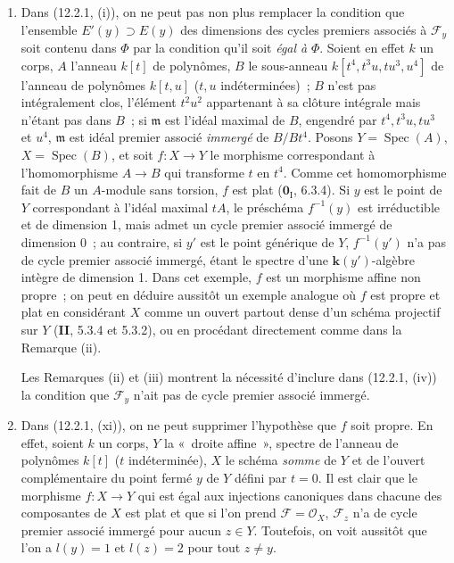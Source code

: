 \begin{remarks}[12.2.3]
\begin{enumerate}[label=(\roman*)]
  \item Dans (12.2.1, (i)), on ne peut pas non plus remplacer la condition que
  l'ensemble $E'(y)\supset E(y)$ des dimensions des cycles premiers associés à
  $\mathcal F_y$ soit contenu dans $\Phi$ par la condition qu'il soit
  \emph{égal à} $\Phi$. Soient en effet $k$ un corps, $A$ l'anneau $k[t]$ de
  polynômes, $B$ le sous-anneau $k[t^4,t^3u,tu^3,u^4]$ de l'anneau de polynômes
  $k[t,u]$ ($t,u$ indéterminées)~; $B$ n'est pas intégralement clos, l'élément
  $t^2u^2$ appartenant à sa clôture intégrale mais n'étant pas dans $B$~; si
  $\mathfrak m$ est l'idéal maximal de $B$, engendré par $t^4,t^3u,tu^3$ et
  $u^4$, $\mathfrak m$ est idéal premier associé \emph{immergé} de $B/Bt^4$. Posons
  $Y=\operatorname{Spec}(A)$, $X=\operatorname{Spec}(B)$, et soit $f:X\to Y$
  le morphisme correspondant à l'homomorphisme $A\to B$ qui transforme $t$ en
  $t^4$. Comme cet homomorphisme fait de $B$ un $A$-module sans torsion, $f$
  est plat ($\mathbf 0_{\mathrm I}$, 6.3.4). Si $y$ est le point de $Y$
  correspondant à l'idéal maximal $tA$, le préschéma $f^{-1}(y)$ est
  irréductible et de dimension 1, mais admet un cycle premier associé immergé
  de dimension 0~; au contraire, si $y'$ est le point générique de $Y$,
  $f^{-1}(y')$ n'a pas de cycle premier associé immergé, étant le spectre d'une
  $\boldsymbol{k}(y')$-algèbre intègre de dimension 1. Dans cet exemple, $f$ est un morphisme
  affine non propre~; on peut en déduire aussitôt un exemple analogue où $f$
  est propre et plat en considérant $X$ comme un ouvert partout dense d'un
  schéma projectif sur $Y$ (\textbf{II}, 5.3.4 et 5.3.2), ou en procédant
  directement comme dans la Remarque (ii).

  Les Remarques (ii) et (iii) montrent la nécessité d'inclure dans (12.2.1,
  (iv)) la condition que $\mathcal F_y$ n'ait pas de cycle premier associé
  immergé.

  \item Dans (12.2.1, (xi)), on ne peut supprimer l'hypothèse que $f$ soit
  propre. En effet, soient $k$ un corps, $Y$ la «~droite affine~», spectre de
  l'anneau de polynômes $k[t]$ ($t$ indéterminée), $X$ le schéma \emph{somme}
  de $Y$ et de l'ouvert complémentaire du point fermé $y$ de $Y$ défini par
  $t=0$. Il est clair que le morphisme $f:X\to Y$ qui est égal aux injections
  canoniques dans chacune des composantes de $X$ est plat et que si l'on prend
  $\mathcal F=\mathcal O_X$, $\mathcal F_z$ n'a de cycle premier associé
  immergé pour aucun $z\in Y$. Toutefois, on voit aussitôt que l'on a $l(y)=1$
  et $l(z)=2$ pour tout $z\neq y$.


\end{enumerate}
\end{remarks}
